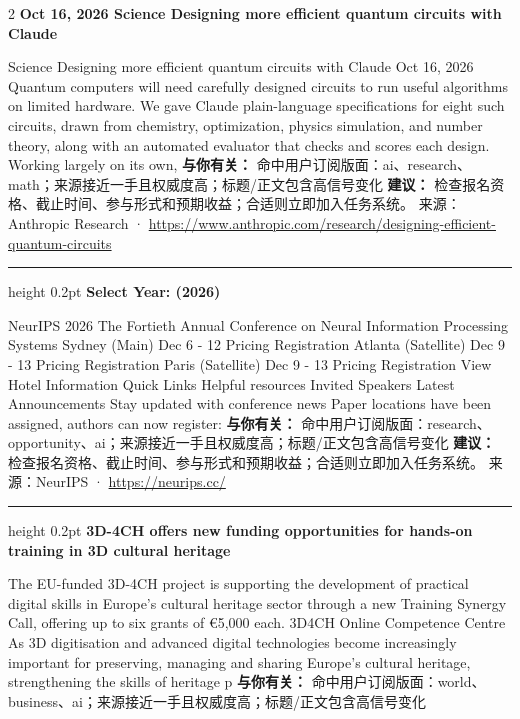 \documentclass[10.5pt]{ctexart}
\begin{document}
\begin{multicols}{2}
{\large\bfseries Oct 16, 2026 Science Designing more efficient quantum circuits with Claude}\par
Science Designing more efficient quantum circuits with Claude Oct 16, 2026 Quantum computers will need carefully designed circuits to run useful algorithms on limited hardware. We gave Claude plain-language specifications for eight such circuits, drawn from chemistry, optimization, physics simulation, and number theory, along with an automated evaluator that checks and scores each design. Working largely on its own, 
\textbf{与你有关：} 命中用户订阅版面：ai、research、math；来源接近一手且权威度高；标题/正文包含高信号变化
\textbf{建议：} 检查报名资格、截止时间、参与形式和预期收益；合适则立即加入任务系统。
{\footnotesize\color{ormuted} 来源：Anthropic Research · \url{https://www.anthropic.com/research/designing-efficient-quantum-circuits}}
\vspace{2mm}
\hrule height 0.2pt
\vspace{2mm}
{\large\bfseries Select Year: (2026)}\par
NeurIPS 2026 The Fortieth Annual Conference on Neural Information Processing Systems Sydney (Main) Dec 6 - 12 Pricing Registration Atlanta (Satellite) Dec 9 - 13 Pricing Registration Paris (Satellite) Dec 9 - 13 Pricing Registration View Hotel Information Quick Links Helpful resources Invited Speakers Latest Announcements Stay updated with conference news Paper locations have been assigned, authors can now register: 
\textbf{与你有关：} 命中用户订阅版面：research、opportunity、ai；来源接近一手且权威度高；标题/正文包含高信号变化
\textbf{建议：} 检查报名资格、截止时间、参与形式和预期收益；合适则立即加入任务系统。
{\footnotesize\color{ormuted} 来源：NeurIPS · \url{https://neurips.cc/}}
\vspace{2mm}
\hrule height 0.2pt
\vspace{2mm}
{\large\bfseries 3D-4CH offers new funding opportunities for hands-on training in 3D cultural heritage}\par
The EU-funded 3D-4CH project is supporting the development of practical digital skills in Europe's cultural heritage sector through a new Training Synergy Call, offering up to six grants of €5,000 each. 3D4CH Online Competence Centre As 3D digitisation and advanced digital technologies become increasingly important for preserving, managing and sharing Europe's cultural heritage, strengthening the skills of heritage p
\textbf{与你有关：} 命中用户订阅版面：world、business、ai；来源接近一手且权威度高；标题/正文包含高信号变化

\end{multicols}
\end{document}
